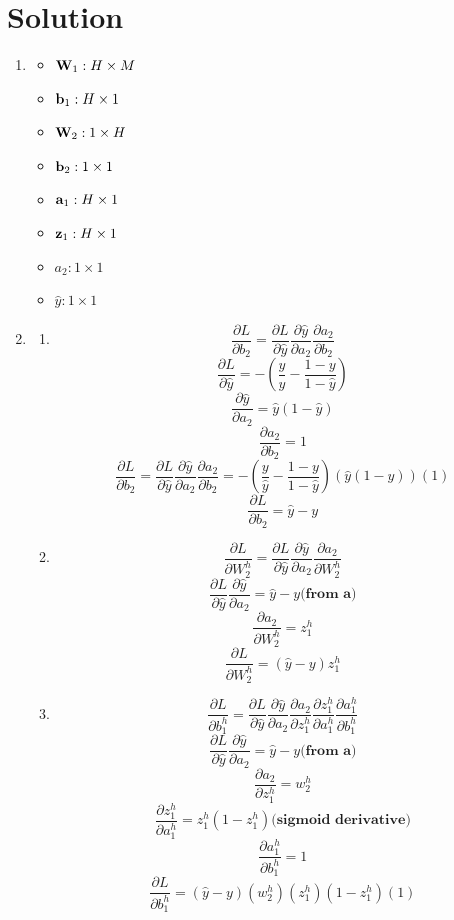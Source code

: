 \documentclass[submit]{harvardml}
\newenvironment{answer}
  {\section*{Solution}}
{}
\begin{document}
\begin{answer}
  \begin{enumerate}
    \item \begin{itemize}
            \item $\bold{W}_1 : H \times M$
            \item $\bold{b}_1 : H \times 1$
            \item $\bold{W}_2 : 1 \times H$
            \item $\bold{b}_2 : 1 \times 1$
            \item $\bold{a}_1 : H \times 1$
            \item $\bold{z}_1 : H \times 1$
            \item $a_2 : 1 \times 1$
            \item $\hat{y} : 1 \times 1$
          \end{itemize}

    \item \begin{enumerate}
            \item
                    $$\frac {\partial L}{\partial b_2} = \frac {\partial L}{\partial \hat{y}}\frac {\partial \hat{y}}{\partial a_2}\frac {\partial a_2}{\partial b_2}$$
                    $$\frac {\partial L}{\partial \hat{y}} = -(\frac{y}{\hat{y}} - \frac{1-y}{1-\hat{y}})$$
                    $$\frac {\partial \hat{y}}{\partial a_2}= \hat{y}(1-\hat{y})$$
                    $$\frac {\partial a_2}{\partial b_2} = 1$$
                    $$\frac {\partial L}{\partial b_2} = \frac {\partial L}{\partial \hat{y}}\frac {\partial \hat{y}}{\partial a_2}\frac {\partial a_2}{\partial b_2} = -(\frac{y}{\hat{y}} - \frac{1-y}{1-\hat{y}})(\hat{y}(1-\hat{y}))(1)$$
                    $$\frac {\partial L}{\partial b_2} = \hat{y}-y$$
            \item
                    $$\frac {\partial L}{\partial W_2^h} = \frac {\partial L}{\partial \hat{y}}\frac {\partial \hat{y}}{\partial a_2} \frac {\partial a_2}{\partial W_2^h}$$
                    $$\frac {\partial L}{\partial \hat{y}}\frac {\partial \hat{y}}{\partial a_2} = \hat{y}-y \textbf{(from a)}$$
                    $$\frac {\partial a_2}{\partial W_2^h}=z_1^h$$
                    $$\frac {\partial L}{\partial W_2^h} = (\hat{y}-y)z_1^h$$

            \item
                    $$\frac {\partial L}{\partial b_1^h}  = \frac {\partial L}{\partial \hat{y}}\frac {\partial \hat{y}}{\partial a_2}\frac {\partial a_2}{\partial z_1^h}\frac {\partial z_1^h}{\partial a_1^h}\frac {\partial a_1^h}{\partial b_1^h}$$
                    $$\frac {\partial L}{\partial \hat{y}}\frac {\partial \hat{y}}{\partial a_2} = \hat{y}-y \textbf{(from a)}$$
                    $$\frac {\partial a_2}{\partial z_1^h} = w_2^h$$
                    $$\frac {\partial z_1^h}{\partial a_1^h}=z_1^h(1-z_1^h) \textbf{(sigmoid derivative)}$$
                    $$\frac {\partial a_1^h}{\partial b_1^h} = 1$$
                    $$\frac {\partial L}{\partial b_1^h}  = (\hat{y}-y)(w_2^h)(z_1^h)(1-z_1^h)(1)$$


\end{enumerate}
\end{enumerate}
\end{answer}
\end{document}
